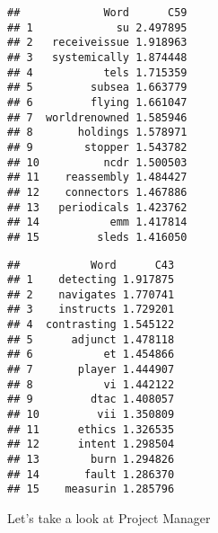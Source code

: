 \documentclass[]{article}
\newenvironment{Shaded}{\begin{snugshade}}{\end{snugshade}}
\newcommand{\KeywordTok}[1]{\textcolor[rgb]{0.13,0.29,0.53}{\textbf{{#1}}}}
\newcommand{\DecValTok}[1]{\textcolor[rgb]{0.00,0.00,0.81}{{#1}}}
\newcommand{\StringTok}[1]{\textcolor[rgb]{0.31,0.60,0.02}{{#1}}}
\newcommand{\NormalTok}[1]{{#1}}
\begin{document}
\begin{Shaded}
\end{Shaded}

\begin{verbatim}
##             Word      C59
## 1             su 2.497895
## 2   receiveissue 1.918963
## 3   systemically 1.874448
## 4           tels 1.715359
## 5         subsea 1.663779
## 6         flying 1.661047
## 7  worldrenowned 1.585946
## 8       holdings 1.578971
## 9        stopper 1.543782
## 10          ncdr 1.500503
## 11    reassembly 1.484427
## 12    connectors 1.467886
## 13   periodicals 1.423762
## 14           emm 1.417814
## 15         sleds 1.416050
\end{verbatim}

\begin{Shaded}
\end{Shaded}

\begin{verbatim}
##           Word      C43
## 1    detecting 1.917875
## 2    navigates 1.770741
## 3    instructs 1.729201
## 4  contrasting 1.545122
## 5      adjunct 1.478118
## 6           et 1.454866
## 7       player 1.444907
## 8           vi 1.442122
## 9         dtac 1.408057
## 10         vii 1.350809
## 11      ethics 1.326535
## 12      intent 1.298504
## 13        burn 1.294826
## 14       fault 1.286370
## 15    measurin 1.285796
\end{verbatim}

Let's take a look at Project Manager
\end{document}
